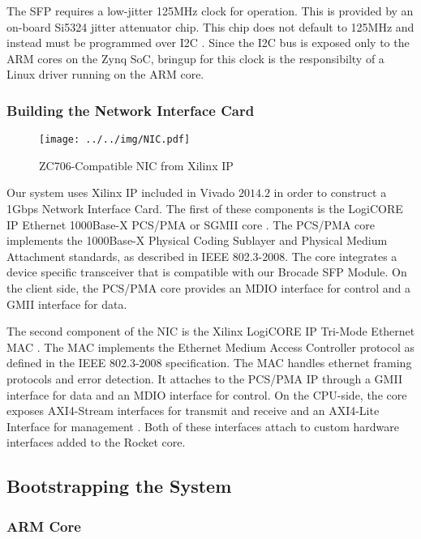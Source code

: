     The SFP requires a low-jitter 125MHz clock for operation. This is provided
    by an on-board Si5324 jitter attenuator chip. This chip does not default to 
    125MHz and instead must be programmed over I2C \cite{xapp1082}. Since the I2C bus is exposed
    only to the ARM cores on the Zynq SoC, bringup for this clock is the 
    responsibilty of a Linux driver running on the ARM core.

\subsubsection{Building the Network Interface Card}

\begin{figure}[t]
\begin{center}
\label{fig:nic}
\texttt{[image: ../../img/NIC.pdf]}
\caption{ZC706-Compatible NIC from Xilinx IP}
\end{center}
\end{figure}

    Our system uses Xilinx IP included in Vivado $2014.2$ in order to construct 
    a 1Gbps Network Interface Card. The first of these components is the LogiCORE
    IP Ethernet 1000Base-X PCS/PMA or SGMII core \cite{pcspma}. The PCS/PMA
    core implements the 1000Base-X Physical Coding Sublayer and Physical Medium
    Attachment standards, as described in IEEE 802.3-2008. The core integrates
    a device specific transceiver that is compatible with our Brocade SFP Module.
    On the client side, the PCS/PMA core provides an MDIO interface for control
    and a GMII interface for data.

    The second component of the NIC is the Xilinx LogiCORE IP Tri-Mode Ethernet 
    MAC \cite{trimac}. The MAC implements the Ethernet Medium Access Controller
    protocol as defined in the IEEE 802.3-2008 specification. The MAC handles
    ethernet framing protocols and error detection. It attaches to the PCS/PMA
    IP through a GMII interface for data and an MDIO interface for control.
    On the CPU-side, the core exposes AXI4-Stream interfaces for transmit and 
    receive and an AXI4-Lite Interface for management \cite{axi}. Both of these
    interfaces attach to custom hardware interfaces added to the Rocket core.


\subsection{Bootstrapping the System}
    \subsubsection{ARM Core}

